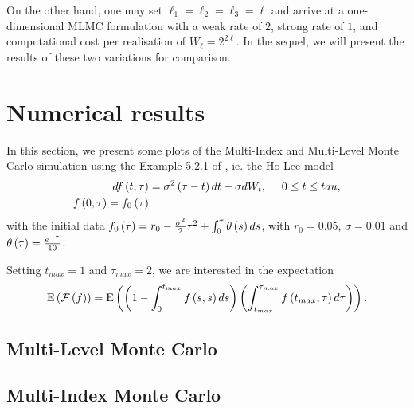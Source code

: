 \documentclass[11pt]{amsart}
\begin{document}
On the other hand, one may set $\ell_1=\ell_2=\ell_3=\ell$
and arrive at a one-dimensional MLMC formulation with a weak rate of $2$, strong rate of $1$, and computational cost per realisation of $W_\ell=2^{2\ell}$. In the sequel, we will present the results of these two variations for comparison.

\section{Numerical results}

In this section, we present some plots of the Multi-Index and Multi-Level Monte Carlo simulation using the Example 5.2.1 of \cite{bjork2013monte}, ie. the Ho-Lee model
\begin{align}
d f \left( {t,\tau} \right) & = \sigma^2 \left( {\tau-t} \right) dt 
+ \sigma dW_t, ~~~~ 0 \leq t \leq tau, 
\nonumber
\\
f \left( {0, \tau} \right) = f_0 \left( { \tau} \right)
\end{align}
with the initial data
$f_0 \left( {\tau } \right) = r_0- \frac{\sigma^2}{2}\tau^2 + 
\int_0^\tau \theta \left( {s} \right) ds$, with $r_0=0.05$,
$\sigma=0.01$ and $\theta \left( {\tau} \right) = \frac{e^{-\tau}}{10}$.

Setting $t_{max}=1$ and $\tau_{max}=2$, we are interested in the
expectation
\begin{align}
\mathrm{E} \left( {{\mathcal F \left( {f} \right)}} \right)
=
\mathrm{E} \left( {{ \left( {1 - \int_0^{t_{max}} f \left( {s,s} \right) ds } \right) \left( {\int_{t_{max}}^{\tau_{max}} f 
\left( {t_{max},\tau} \right) d \tau} \right)}} \right).
\end{align}


\subsection{Multi-Level Monte Carlo}

\subsection{Multi-Index Monte Carlo}





\appendix
\end{document}
